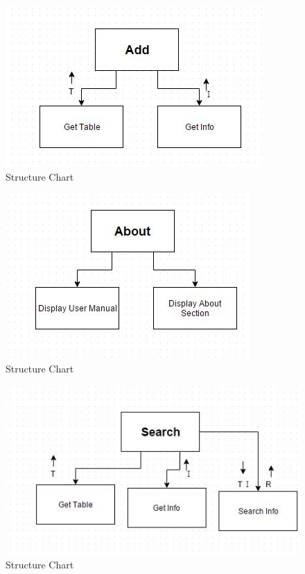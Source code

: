 \begin{figure}[H]
    \includegraphics[width=\textwidth]{HChart4.JPG}
    \caption{Structure Chart} \label{fig:StructureChart}
\end{figure}

\begin{figure}[H]
    \includegraphics[width=\textwidth]{HChart5.JPG}
    \caption{Structure Chart} \label{fig:StructureChart}
\end{figure}

\begin{figure}[H]
    \includegraphics[width=\textwidth]{HChart6.JPG}
    \caption{Structure Chart} \label{fig:StructureChart}
\end{figure}

